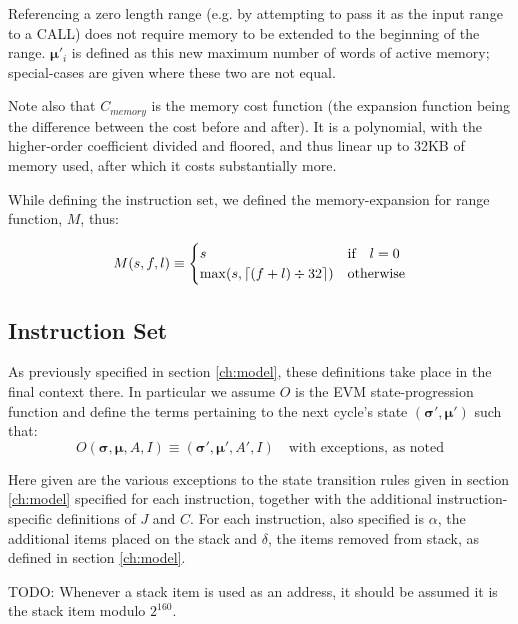 \documentclass[9pt,oneside]{amsart}
\DeclarePairedDelimiter{\ceil}{\lceil}{\rceil}
\begin{document}
Referencing a zero length range (e.g. by attempting to pass it as the input range to a CALL) does not require memory to be extended to the beginning of the range. $\boldsymbol{\mu}'_i$ is defined as this new maximum number of words of active memory; special-cases are given where these two are not equal.

Note also that $C_{memory}$ is the memory cost function (the expansion function being the difference between the cost before and after). It is a polynomial, with the higher-order coefficient divided and floored, and thus linear up to 32KB of memory used, after which it costs substantially more.

While defining the instruction set, we defined the memory-expansion for range function, $M$, thus:

\begin{equation}
M(s, f, l) \equiv \begin{cases}
s & \text{if} \quad l = 0 \\
\max(s, \ceil{ (f + l) \div 32 }) & \text{otherwise}
\end{cases}
\end{equation}

\subsection{Instruction Set}

As previously specified in section \ref{ch:model}, these definitions take place in the final context there. In particular we assume $O$ is the EVM state-progression function and define the terms pertaining to the next cycle's state $(\boldsymbol{\sigma}', \boldsymbol{\mu}')$ such that:
\begin{equation}
O(\boldsymbol{\sigma}, \boldsymbol{\mu}, A, I) \equiv (\boldsymbol{\sigma}', \boldsymbol{\mu}', A', I) \quad \text{with exceptions, as noted}
\end{equation}

Here given are the various exceptions to the state transition rules given in section \ref{ch:model} specified for each instruction, together with the additional instruction-specific definitions of $J$ and $C$. For each instruction, also specified is $\alpha$, the additional items placed on the stack and $\delta$, the items removed from stack, as defined in section \ref{ch:model}.

TODO: Whenever a stack item is used as an address, it should be assumed it is the stack item modulo $2^{160}$.
\end{document}
